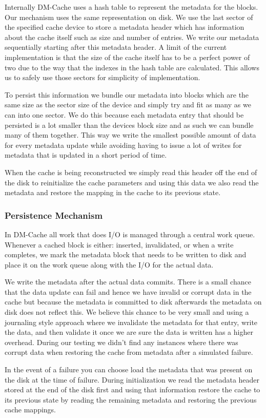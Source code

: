 Internally DM-Cache uses a hash table to represent the metadata for
the blocks. Our mechanism uses the same representation on disk. We use
the last sector of the specified cache device to store a metadata
header which has information about the cache itself such as size and
number of entries. We write our metadata sequentially starting after
this metadata header. A limit of the current implementation is that
the size of the cache itself has to be a perfect power of two due to
the way that the indexes in the hash table are calculated. This allows
us to safely use those sectors for simplicity of implementation.

To persist this information we bundle our metadata into blocks which
are the same size as the sector size of the device and simply try and
fit as many as we can into one sector. We do this because each
metadata entry that should be persisted is a lot smaller than the
devices block size and as such we can bundle many of them
together. This way we write the smallest possible amount of data for
every metadata update while avoiding having to issue a lot of writes
for metadata that is updated in a short period of time.

When the cache is being reconstructed we simply read this header off
the end of the disk to reinitialize the cache parameters and using
this data we also read the metadata and restore the mapping in the
cache to its previous state.

\subsubsection{Persistence Mechanism}

In DM-Cache all work that does I/O is managed through a central work
queue. Whenever a cached block is either: inserted, invalidated, or
when a write completes, we mark the metadata block that needs to be
written to disk and place it on the work queue along with the I/O for
the actual data.

We write the metadata after the actual data commits. There is a small
chance that the data update can fail and hence we have invalid or
corrupt data in the cache but because the metadata is committed to
disk afterwards the metadata on disk does not reflect this. We believe
this chance to be very small and using a journaling style approach
where we invalidate the metadata for that entry, write the data, and
then validate it once we are sure the data is written has a higher
overhead. During our testing we didn't find any instances where there
was corrupt data when restoring the cache from metadata after a
simulated failure.

In the event of a failure you can choose load the metadata that was
present on the disk at the time of failure. During initialization we
read the metadata header stored at the end of the disk first and using
that information restore the cache to its previous state by reading
the remaining metadata and restoring the previous cache mappings.
